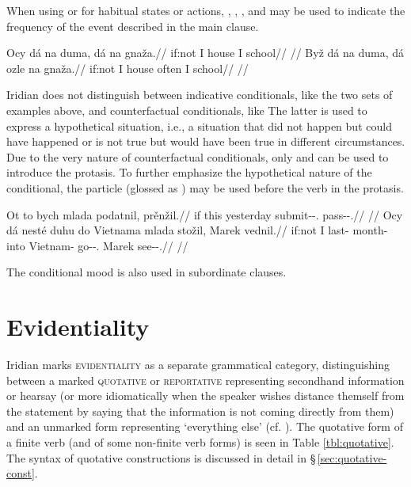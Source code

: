 When using  or  for habitual states or actions,
, , ,
 and  may be used to indicate the frequency
of the event described in the main clause.

\pex
	\a
	\begingl
		\gla Ocy dá na duma, dá na gnaža.//
		\glb if:not I \Loc{} house I \Loc{} school//
		\glft {}//
	\endgl
	\a
	\begingl
		\gla Byž dá na duma, dá ozle na gnaža.//
		\glb if:not I \Loc{} house often I \Loc{} school//
		\glft {}//
	\endgl
\xe


Iridian does not distinguish between indicative conditionals, like the two sets
of examples above, and counterfactual conditionals, like  The latter is used to express a hypothetical situation, i.e.,
a situation that did not happen but could have happened or is not true but would
have been true in different circumstances. Due to the very nature of
counterfactual conditionals, only  and  can be used to
introduce the protasis. To further emphasize the hypothetical nature of the
conditional, the particle  (glossed as \Hyp{}) may be used before the
verb in the protasis.

\pex
	\a
	\begingl
		\gla Ot to bych mlada podatnil, prěnžil.//
		\glb if this yesterday \Hyp{} submit-\Pv{}-\Cond{}.\Pf{} pass-\Av{}-\Cond{}.\Pf{}//
		\glft {}//
	\endgl
	\a
	\begingl
		\gla Ocy dá nesté duhu do Vietnama mlada stožil, Marek vednil.//
		\glb if:not I last-\Att{} month-\Ins{} into Vietnam-\Acc{} \Hyp{} go-\Av{}-\Cond{}.\Pf{} Marek see-\Pv{}-\Cond{}.\Pf{}//
		\glft {}//
	\endgl
\xe

The conditional mood is also used in subordinate clauses. 

\section{Evidentiality}\label{sec:quotative}

Iridian marks {\scshape evidentiality} as a separate grammatical category,
distinguishing between a marked {\scshape quotative} or {\scshape reportative}
representing secondhand information or hearsay (or more idiomatically when the
speaker wishes distance themself from the statement by saying that the
information is not coming directly from them) and an unmarked form representing
`everything else' (cf. \cite[31-33]{aikhenvald2004}). The quotative form of a
finite verb (and of some non-finite verb forms) is seen in Table
\ref{tbl:quotative}. The syntax of quotative constructions is discussed in
detail in \S\,\ref{sec:quotative-const}.


